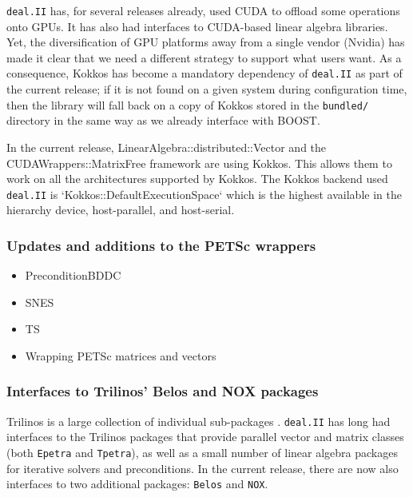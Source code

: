 \documentclass{ansarticle-preprint}
\newcommand{\specialword}[1]{\texttt{#1}}
\newcommand{\dealii}{{\specialword{deal.II}}\xspace}
\begin{document}
\dealii{} has, for several releases already, used CUDA to offload some
operations onto GPUs. It has also had interfaces to CUDA-based linear
algebra libraries. Yet, the diversification of GPU platforms away from
a single vendor (Nvidia) has made it clear that we need a different
strategy to support what users want. As a consequence, Kokkos has
become a mandatory dependency of \dealii{} as part of the current
release; if it is not found on a given system during configuration
time, then the library will fall back on a copy of Kokkos stored in
the \texttt{bundled/} directory in the same way as we already
interface with BOOST.

In the current release, LinearAlgebra::distributed::Vector and the
CUDAWrappers::MatrixFree framework are using Kokkos. This allows them to work on
all the architectures supported by Kokkos. The Kokkos backend used \dealii is
`Kokkos::DefaultExecutionSpace` which is the highest available in the hierarchy
device, host-parallel, and host-serial.

\subsubsection{Updates and additions to the PETSc wrappers}\label{sec:petsc}


\begin{itemize}
\item PreconditionBDDC
\item SNES
\item TS
\item Wrapping PETSc matrices and vectors
\end{itemize}

\subsubsection{Interfaces to Trilinos' Belos and NOX packages}\label{sec:trilinos}

Trilinos is a large collection of individual sub-packages \cite{heroux2005trilinos,trilinos-web-page}. \dealii{}
has long had interfaces to the Trilinos packages that provide parallel
vector and matrix classes (both \texttt{Epetra} and \texttt{Tpetra}),
as well as a small number of linear algebra packages for iterative
solvers and preconditions. In the current release, there are now also
interfaces to two additional packages: \texttt{Belos} and \texttt{NOX}.
\end{document}
